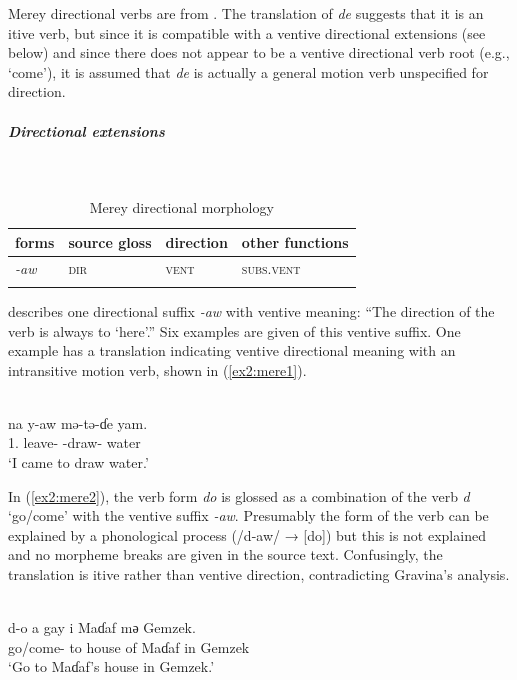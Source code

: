 Merey directional verbs are from \citet{gravinaMereyProvisionalLexicon2003}. The translation of \textit{de} suggests that it is an itive verb, but since it is compatible with a ventive directional extensions (see below) and since there does not appear to be a ventive directional verb root (e.g., `come'), it is assumed that \textit{de} is actually a general motion verb unspecified for direction. 

\subparagraph{Directional extensions}~

\begin{table}[H]
	\caption{Merey directional morphology}
	\label{tab:mere}
	\begin{tabular}{llll} %
		\lsptoprule
		forms & source gloss & direction  & other functions  \\ %
		\midrule
		\textit{-aw}  &  \textsc{dir}  &  \textsc{vent} &   \textsc{subs.vent}  \\
		\lspbottomrule
	\end{tabular}
\end{table} 

\citet[14--15]{gravinaVerbPhraseMerey2007} describes one directional suffix \textit{-aw} with ventive meaning: ``The direction of the verb is always to ‘here’.'' Six examples are given of this ventive suffix. One example has a translation indicating ventive directional meaning with an intransitive motion verb, shown in (\ref{ex2:mere1}). 

\ea\label{ex2:mere1}
 \\
\gll na y-aw mə-tə-ɗe yam.	\\
1. leave- -draw- water	\\
\glt `I came to draw water.'
\z 

In (\ref{ex2:mere2}), the verb form \textit{do} is glossed as a combination of the verb \textit{d} `go/come' with the ventive suffix \textit{-aw}. Presumably the form of the verb can be explained by a phonological process (/d-aw/ → [do]) but this is not explained and no morpheme breaks are given in the source text. Confusingly, the translation is itive rather than ventive direction, contradicting Gravina's analysis.

\ea\label{ex2:mere2}
 \\
\gll d-o a gay i Maɗaf mә Gemzek.	\\
go/come- to house of Maɗaf in Gemzek		\\
\glt `Go to Maɗaf’s house in Gemzek.'
\z 

